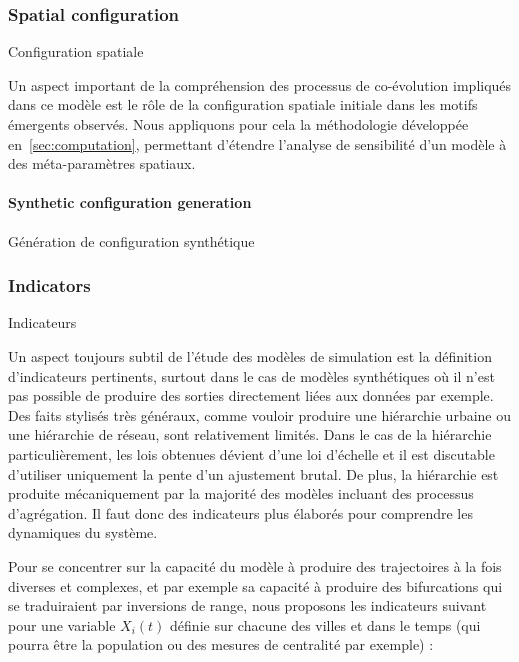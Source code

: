 \subsubsection{Spatial configuration}{Configuration spatiale}

Un aspect important de la compréhension des processus de co-évolution impliqués dans ce modèle est le rôle de la configuration spatiale initiale dans les motifs émergents observés. Nous appliquons pour cela la méthodologie développée en~\ref{sec:computation}, permettant d'étendre l'analyse de sensibilité d'un modèle à des méta-paramètres spatiaux.

\paragraph{Synthetic configuration generation}{Génération de configuration synthétique}










\subsubsection{Indicators}{Indicateurs}

Un aspect toujours subtil de l'étude des modèles de simulation est la définition d'indicateurs pertinents, surtout dans le cas de modèles synthétiques où il n'est pas possible de produire des sorties directement liées aux données par exemple. Des faits stylisés très généraux, comme vouloir produire une hiérarchie urbaine ou une hiérarchie de réseau, sont relativement limités. Dans le cas de la hiérarchie particulièrement, les lois obtenues dévient d'une loi d'échelle et il est discutable d'utiliser uniquement la pente d'un ajustement brutal. De plus, la hiérarchie est produite mécaniquement par la majorité des modèles incluant des processus d'agrégation. Il faut donc des indicateurs plus élaborés pour comprendre les dynamiques du système.


Pour se concentrer sur la capacité du modèle à produire des trajectoires à la fois diverses et complexes, et par exemple sa capacité à produire des bifurcations qui se traduiraient par inversions de range, nous proposons les indicateurs suivant pour une variable $X_i(t)$ définie sur chacune des villes et dans le temps (qui pourra être la population ou des mesures de centralité par exemple) :

